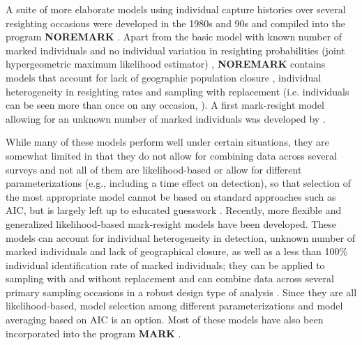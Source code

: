 A suite of more elaborate models using individual capture histories
over several resighting occasions were developed in the 1980s and
90s and compiled into the program \textbf{NOREMARK} \citep{white:1996}. Apart
from the basic model with known number of marked individuals and no
individual variation in resighting probabilities (joint hypergeometric
maximum likelihood estimator) \citep{bartmann_etal:1987,
  white_garrot:1990, neal:1990, neal_etal:1993}, \textbf{NOREMARK} contains
models that account for lack of geographic population closure
\citep{neal_etal:1993}, individual heterogeneity in resighting rates
and sampling with replacement (i.e. individuals can be seen more than
once on any occasion, \citep{minta_mangel:1989, bowden:1993}). A first
mark-resight model allowing for an unknown number of marked
individuals was developed by \citet{arnason_etal:1991}.

While many of these models perform well under certain situations, they
are somewhat limited in that they do not allow for combining data
across several surveys \citep{mcclintock_etal:2006} and not all of
them are likelihood-based or allow for different parameterizations
(e.g., including a time effect on detection), so that selection of the
most appropriate model cannot be based on standard approaches such as
AIC, but is largely left up to educated guesswork
\citep{mcclintock_etal:2006}. Recently, more flexible and generalized
likelihood-based mark-resight models have been developed. These models
can account for individual heterogeneity in detection, unknown number
of marked individuals and lack of geographical closure, as well as a
less than 100\% individual identification rate of marked individuals;
they can be applied to sampling with and without replacement and can
combine data across several primary sampling occasions in a robust
design type of analysis
\citep{mcclintock_etal:2009biometrics,mcclintock_etal:2009mdp}. Since
they are all likelihood-based, model selection among different
parameterizations and model averaging based on AIC is an option. Most
of these models have also been incorporated into the program {\bf
  MARK} \citep{mcclintock_white:2010}.

